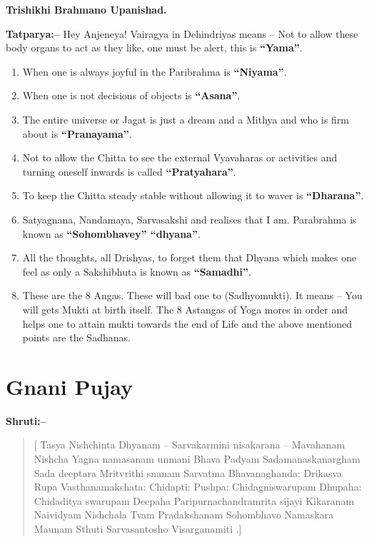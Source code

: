\begin{flushright}
\textbf{Trishikhi Brahmano Upanishad.}
\end{flushright}

\textbf{Tatparya:–} Hey Anjeneya! Vairagya in Dehindriyas means – Not to allow these body organs to act as they like, one must be alert, this is \textbf{“Yama”}.

\begin{enumerate}
\item When one is always joyful in the Paribrahma is \textbf{“Niyama”}.

 \item When one is not decisions of objects is \textbf{“Asana”}.

 \item The entire universe or Jagat is just a dream and a Mithya and who is firm about is \textbf{“Pranayama”}.

 \item Not to allow the Chitta to see the external Vyavaharas or activities and turning oneself inwards is called \textbf{“Pratyahara”}.

 \item To keep the Chitta steady stable without allowing it to waver is \textbf{“Dharana”}.

 \item Satyagnana, Nandamaya, Sarvasakshi and realises that I am. Parabrahma is known as \textbf{“Sohombhavey” “dhyana”}.

 \item All the thoughts, all Drishyas, to forget them that Dhyana which makes one feel as only a Sakshibhuta is known as \textbf{“Samadhi”}.

 \item These are the 8 Angas. These will bad one to (Sadhyomukti). It means – You will gets Mukti at birth itself. The 8 Astangas of Yoga mores in order and helps one to attain mukti towards the end of Life and the above mentioned points are the Sadhanas.

\end{enumerate}

\chapter{Gnani Pujay}

\textbf{Shruti:–}

\begin{verse}
[ Tasya Nishchinta Dhyanam – Sarvakarmini nisakarana – Mavahanam  Nishcha Yagna namasanam  unmani Bhava Padyam  Sadamanaskanargham  Sada deeptara Mritvrithi snanam  Sarvatma Bhavanaghanda:  Drikasva Rupa Vasthanamakshata:  Chidapti: Pushpa:  Chidagniswarupam Dhupaha:  Chidaditya swarupam Deepaha  Paripurnachandramrita sijayi Kikaranam Naividyam  Nishchala Tvam Pradakshanam  Sohombhavo Namaskara Maunam Sthuti  Sarvasantosho Visarganamiti .]
\end{verse}

